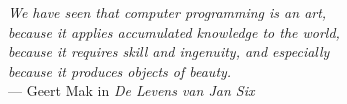 \begin{flushright}{\slshape    
    We have seen that computer programming is an art, \\ 
    because it applies accumulated knowledge to the world, \\ 
    because it requires skill and ingenuity, and especially \\
    because it produces objects of beauty.} \\ \medskip
    --- Geert Mak in \emph{De Levens van Jan Six} \cite{Mak}
\end{flushright}